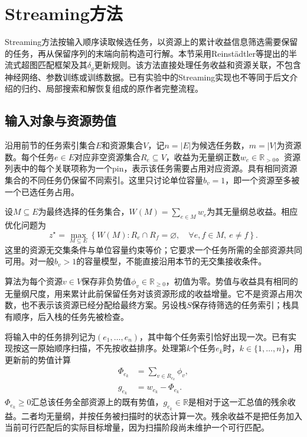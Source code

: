 \section{Streaming方法}
\label{sec:03_02}

Streaming方法按输入顺序读取候选任务，以资源上的累计收益信息筛选需要保留的任务，再从保留序列的末端向前构造可行解。本节采用Reinstädtler等提出的半流式超图匹配框架及其$\delta_g$更新规则\cite{ReinstadtlerFPU2025}。该方法直接处理任务收益和资源关联，不包含神经网络、参数训练或训练数据。已有实验中的Streaming实现也不等同于后文介绍的归约、局部搜索和解恢复组成的原作者完整流程。

\subsection{输入对象与资源势值}

沿用前节的任务索引集合$E$和资源集合$V$，记$n=|E|$为候选任务数，$m=|V|$为资源数。每个任务$e\in E$对应非空资源集合$R_e\subseteq V$，收益为无量纲正数$w_e\in\mathbb{R}_{>0}$。资源列表中的每个关联项称为一个pin，表示该任务需要占用对应资源。具有相同资源集合的不同任务仍保留不同索引。这里只讨论单位容量$b_v=1$，即一个资源至多被一个已选任务占用。

设$M\subseteq E$为最终选择的任务集合，$W(M)=\sum_{e\in M}w_e$为其无量纲总收益。相应优化问题为
\begin{equation}
 z^\star=\max_{M\subseteq E}\left\{W(M):
 R_e\cap R_f=\varnothing,
 \quad\forall e,f\in M,\ e\ne f\right\}.
\label{s0302:matching_problem}
\end{equation}
这里的资源无交集条件与单位容量约束等价；它要求一个任务所需的全部资源共同可用。对一般$b_v>1$的容量模型，不能直接沿用本节的无交集接收条件。

算法为每个资源$v\in V$保存非负势值$\phi_v\in\mathbb{R}_{\geq0}$，初值为零。势值与收益具有相同的无量纲尺度，用来累计此前保留任务对该资源形成的收益增量。它不是资源占用次数，也不表示该资源已经分配给最终方案。另设栈$S$保存待筛选的任务索引；栈具有顺序，后入栈的任务先被检查。

将输入中的任务排列记为$(e_1,\ldots,e_n)$，其中每个任务索引恰好出现一次。已有实现按这一原始顺序扫描，不先按收益排序。处理第$k$个任务$e_k$时，$k\in\{1,\ldots,n\}$，用更新前的势值计算
\begin{align}
 \Phi_{e_k}&=\sum_{v\in R_{e_k}}\phi_v,
 \label{s0302:potential_sum}\\
 g_{e_k}&=w_{e_k}-\Phi_{e_k}.
 \label{s0302:residual_gain}
\end{align}
$\Phi_{e_k}\geq0$汇总该任务全部资源上的既有势值，$g_{e_k}\in\mathbb{R}$是相对于这一汇总值的残余收益。二者均无量纲，并按任务被扫描时的状态计算一次。残余收益不是把任务加入当前可行匹配后的实际目标增量，因为扫描阶段尚未维护一个可行匹配。

